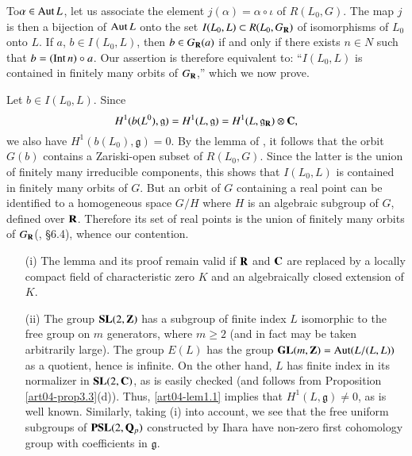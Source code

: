 To\pageoriginale $\alpha\in \operatorname{\mathrm{Aut}} L$, let us associate the element $j(\alpha)=\alpha\circ \iota$ of $R(L_{0},G)$. The map $j$ is then a bijection of $\operatorname{\mathrm{Aut}} L$ onto the set $I(L_{0},L)\subset R(L_{0},G_{\mathbf{R}})$ of isomorphisms of $L_{0}$ onto $L$. If $a$, $b\in I(L_{0},L)$, then $b\in G_{\mathbf{R}}(a)$ if and only if there exists $n\in N$ such that $b=(\operatorname{\mathrm{Int}} n)\circ a$. Our assertion is therefore equivalent to: ``$I(L_{0},L)$ is contained in finitely many orbits of $G_{\mathbf{R}}$,'' which we now prove.

Let $b\in I(L_{0},L)$. Since
$$
H^{1}(b(L^{0}),\mathfrak{g})=H^{1}(L,\mathfrak{g})=H^{1}(L,\mathfrak{g}_{\mathbf{R}})\otimes \mathbf{C},
$$
we also have $H^{1}(b(L_{0}),\mathfrak{g})=0$. By the lemma of \cite{art04-key33}, it follows that the orbit $G(b)$ contains a Zariski-open subset of $R(L_{0},G)$. Since the latter is the union of finitely many irreducible components, this shows that $I(L_{0},L)$ is contained in finitely many orbits of $G$. But an orbit of $G$ containing a real point can be identified to a homogeneous space $G/H$ where $H$ is an algebraic subgroup of $G$, defined over $\mathbf{R}$. Therefore its set of real points is the union of finitely many orbits of $G_{\mathbf{R}}$(\cite{art04-key8}, \S6.4), whence our contention.

\begin{remark}\label{art04-rem1.2}
\begin{itemize}
\item[(i)] The lemma and its proof remain valid if $\mathbf{R}$ and $\mathbf{C}$ are replaced by a locally compact field of characteristic zero $K$ and an algebraically closed extension of $K$.

\item[(ii)] The group $\mathbf{SL}(2,\mathbf{Z})$ has a subgroup of finite index $L$ isomorphic to the free group on $m$ generators, where $m\geq 2$ (and in fact may be taken arbitrarily large). The group $E(L)$ has the group $\mathbf{GL}(m,\mathbf{Z})=\operatorname{\mathrm{Aut}} (L/(L,L))$ as a quotient, hence is infinite. On the other hand, $L$ has finite index in its normalizer in $\mathbf{SL}(2,\mathbf{C})$, as is easily checked (and follows from Proposition \ref{art04-prop3.3}(d)). Thus, \ref{art04-lem1.1} implies that $H^{1}(L,\mathfrak{g})\neq 0$, as is well known. Similarly, taking (i) into account, we see that the free uniform subgroups of $\mathbf{PSL}(2,\mathbf{Q}_{p})$ constructed by Ihara \cite{art04-key15} have non-zero first cohomology group with coefficients in $\mathfrak{g}$.
\end{itemize}
\end{remark}

